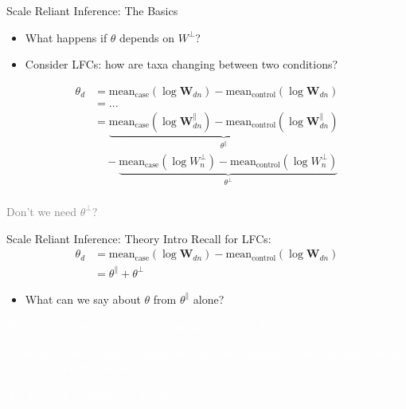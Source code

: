 \documentclass[
  ignorenonframetext,
]{beamer}
\providecommand{\tightlist}{%
  \setlength{\itemsep}{0pt}\setlength{\parskip}{0pt}}
\begin{document}
\begin{frame}{Scale Reliant Inference: The Basics}
\protect\hypertarget{scale-reliant-inference-the-basics-2}{}
\begin{itemize}
\item
  What happens if \(\theta\) depends on \(W^\perp\)?
\item
  Consider LFCs: how are taxa changing between two conditions?
\end{itemize}

\begin{align*}
\theta_d &= \text{mean}_{\text{case}}(\log \mathbf{W}_{dn}) - \text{mean}_{\text{control}}(\log \mathbf{W}_{dn})\\
&= ... \\
&= \underbrace{\text{mean}_{\text{case}}(\log \mathbf{W}_{dn}^\parallel) - \text{mean}_{\text{control}}(\log \mathbf{W}_{dn}^\parallel)}_{\theta^\parallel}\\
& \, \, \, \, \, \, - \underbrace{\text{mean}_{\text{case}}(\log W_{n}^\perp) - \text{mean}_{\text{control}}(\log W_{n}^\perp)}_{\theta^\perp}\\
\end{align*}

\textcolor{gray}{Don't we need $\theta^\perp$?}
\end{frame}

\begin{frame}{Scale Reliant Inference: Theory Intro}
\protect\hypertarget{scale-reliant-inference-theory-intro}{}
Recall for LFCs: \begin{align*}
\theta_d &= \text{mean}_{\text{case}}(\log \mathbf{W}_{dn} ) - \text{mean}_{\text{control}}(\log \mathbf{W}_{dn} )\\
&= \theta^\parallel + \theta^\perp
\end{align*}

\begin{itemize}
\tightlist
\item
  What can we say about \(\theta\) from \(\theta^\parallel\) alone?
\end{itemize}

\textcolor{white}{Statistical perspective: $\theta$ is not identifiable without $\theta^\perp$.}

\textcolor{white}{Practical issues: unbiased estimators, calibrated confidence sets, and type-I error control **NOT** possible!}

\textcolor{white}{See Nixon et al. (2023) for details.}
\end{frame}
\end{document}
